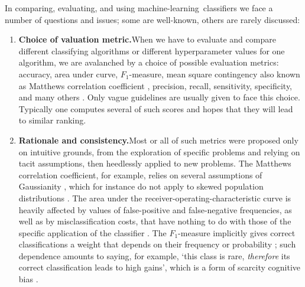 \documentclass[\ifafour a4paper,12pt,\else a5paper,10pt,\fi%
onecolumn,oneside,article,%
british%
]{memoir}
\theoremstyle{remark}
\theoremstyle{innote}
\renewcommand*{\|}[1][]{\nonscript\:#1\vert\nonscript\:\mathopen{}}
\newcommand*{\sect}{\S}%
\newcommand*{\ml}{machine-learning}
\begin{document}
\bigskip

In comparing, evaluating, and using \ml\ classifiers we face a number of questions and issues; some are well-known, others are rarely discussed:

\begin{enumerate}[label=\textbf{\textsf{i\arabic*}},ref=\textbf{\textsf{i\arabic*}},itemsep=\parsep]
  
\item\label{item:metrics}\textsf{\textbf{Choice of valuation metric.}}\enspace When we have to evaluate and compare different classifying algorithms or different hyperparameter values for one algorithm, we are avalanched by a choice of possible evaluation metrics: accuracy, area under curve, $F_{1}$-measure, mean square contingency \autocites[denoted \enquote{$r$} there]{yule1912} also known as Matthews correlation coefficient \autocites{matthews1975}[\sect~31 p.~183]{fisher1925_r1963}, precision, recall, sensitivity, specificity, and many others \autocites{sammutetal2011_r2017}[see also the analysis in ][]{goodmanetal1954,goodmanetal1959,goodmanetal1963,goodmanetal1972b}. Only vague guidelines are usually given to face this choice. Typically one computes several of such scores and hopes that they will lead to similar ranking.

\item\label{item:rationale}\textsf{\textbf{Rationale and consistency.}}\enspace Most or all of such metrics were proposed only on intuitive grounds, from the exploration of specific problems and relying on tacit assumptions, then heedlessly applied to new problems. The Matthews correlation coefficient, for example, relies on several assumptions of Gaussianity \autocites[\sect~31 p.~183 first paragraph]{fisher1925_r1963}, which for instance do not apply to skewed population distributions \autocites{jenietal2013,zhu2020}. The area under the receiver-operating-characteristic curve is heavily affected by values of false-positive and false-negative frequencies, as well as by misclassification costs, that have nothing to do with those of the specific application of the classifier \autocites{bakeretal2001,loboetal2008}. The $F_{1}$-measure implicitly gives correct classifications a weight that depends on their frequency or probability \autocites{handetal2018}; such dependence amounts to saying, for example, \enquote*{this class is rare, \emph{therefore} its correct classification leads to high gains}, which is a form of scarcity cognitive bias \autocites{camereretal1989,kimetal1999,mittoneetal2009}.


\end{enumerate}
\end{document}
